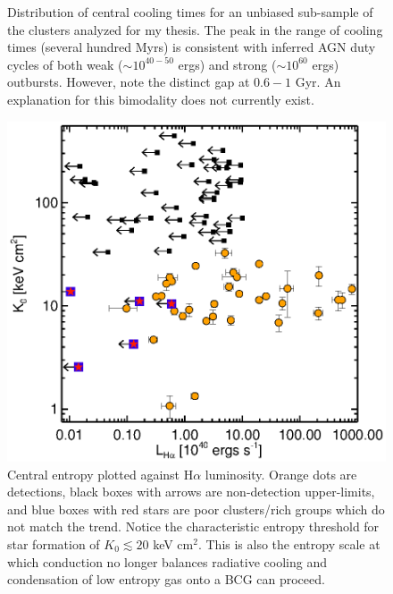\documentclass[11pt]{article}
\begin{document}
\begin{figure}[t]
\begin{minipage}[t]{0.5\linewidth}
        \caption{\small Distribution of central cooling times for an
	unbiased sub-sample of the clusters analyzed for my
	thesis. The peak in the range of cooling times (several hundred Myrs)
	is consistent with inferred AGN duty cycles of both weak ($\sim
	10^{40-50}$ ergs) and strong ($\sim 10^{60}$ ergs)
	outbursts. However, note the distinct gap at $0.6-1$ Gyr. An
	explanation for this bimodality does not currently exist.}
	\label{fig:tcool}
    \end{minipage}
    \hspace{0.1cm}
    \begin{minipage}[t]{0.5\linewidth}
        \centering
        \includegraphics*[width=\textwidth, trim=28mm 8mm 30mm 10mm, clip]{ha}
        \caption{\small Central entropy plotted against H$\alpha$
	luminosity. Orange dots are detections, black boxes with
	arrows are non-detection upper-limits, and blue boxes with red stars
	are poor clusters/rich groups which do not match the
	trend. Notice the characteristic entropy threshold for star
	formation of $K_0 \lesssim 20$ keV cm$^2$. This is also the entropy scale at
	which conduction no longer balances radiative cooling and condensation
	of low entropy gas onto a BCG can proceed.}
        \label{fig:ha}
    \end{minipage}
    \hspace{0.1in}
    \begin{minipage}[t]{0.5\linewidth}
        \centering

\end{minipage}
\end{figure}
\end{document}
